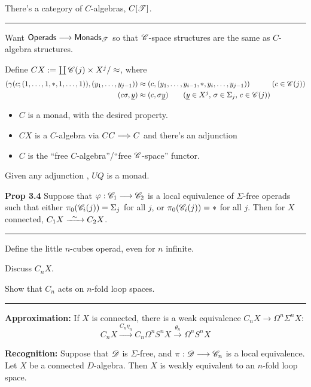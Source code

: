 \documentclass[11pt]{article}
\begin{document}
\begin{Operads}
\begin{itemise}
\item There's a category of $C$-algebras, $C[\mathscr{T}]$.
\hrule
\item Want $\mathsf{Operads}\longrightarrow\mathsf{Monads_{\mathscr{T}}}$ so that $\mathscr{C}$-space structures are the same as $C$-algebra structures.
\item Define $CX:=\coprod\mathscr{C}(j)\times X^j/\approx$, where
\begin{alignat*}{2}
(\gamma(c;(1,\ldots,1,*,1,\ldots,1)),(y_1,\ldots,y_{j-1}))&\approx(c,(y_1,\ldots,y_{i-1},*,y_i,\ldots,y_{j-1}))&\qquad&\text{($c\in\scrC(j)$)}
\\(c\sigma,\underline{y})&\approx (c,\sigma\underline{y})\makebox[0cm][l]{\qquad ($\underline{y}\in X^j$, $\sigma\in\Sigma_j$, $c\in\scrC(j)$)}%
\end{alignat*}
\begin{itemize}\squishlist
\item $C$ is a monad, with the desired property.
\item $CX$ is a $C$-algebra via $CC\Longrightarrow C$ and there's an adjunction 
\item $C$ is the ``free $C$-algebra''/``free $\mathscr{C}$-space'' functor.
\end{itemize}
\item Given any adjunction , $UQ$ is a monad.
\item \textbf{Prop 3.4} Suppose that $\varphi:\mathscr{C}_1\longrightarrow\mathscr{C}_2$ is a local equivalence of $\Sigma$-free operads such that either $\pi_0(\mathscr{C}_i(j))=\Sigma_j$ for all $j$, or $\pi_0(\mathscr{C}_i(j))=*$ for all $j$. Then for $X$ connected, $C_1X\weakequiv C_2X$.
\hrule
\item Define the little $n$-cubes operad, even for $n$ infinite.
\item Discuss $C_nX$.
\item Show that $C_n$ acts on $n$-fold loop spaces.
\hrule
\item \textbf{Approximation:} If $X$ is connected, there is a weak equivalence $C_nX\to\Omega^n\Sigma^nX$:
\[C_nX\overset{C_n\eta_n}{\to}C_n\Omega^nS^nX\overset{\theta_n}{\to}\Omega^nS^nX\]
\item \textbf{Recognition:} 
Suppose that $\mathscr{D}$ is $\Sigma$-free, and $\pi:\mathscr{D}\longrightarrow\mathscr{C}_n$ is a local equivalence. Let $X$ be a connected $D$-algebra. Then $X$ is weakly equivalent to an $n$-fold loop space.

\end{itemise}
\end{Operads}
\end{document}

